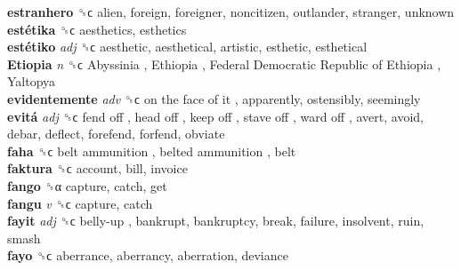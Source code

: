 \textbf{estranhero} ␝ϲ  alien, foreign, foreigner, noncitizen, outlander, stranger, unknown  \\
\textbf{estétika} ␝ϲ  aesthetics, esthetics  \\
\textbf{estétiko} \emph{adj}  ␝ϲ  aesthetic, aesthetical, artistic, esthetic, esthetical  \\
\textbf{Etiopia} \emph{n}  ␝ϲ   Abyssinia ,  Ethiopia ,  Federal Democratic Republic of Ethiopia ,  Yaltopya   \\
\textbf{evidentemente} \emph{adv}  ␝ϲ   on the face of it , apparently, ostensibly, seemingly  \\
\textbf{evitá} \emph{adj}  ␝ϲ   fend off ,  head off ,  keep off ,  stave off ,  ward off , avert, avoid, debar, deflect, forefend, forfend, obviate  \\
\textbf{faha} ␝ϲ   belt ammunition ,  belted ammunition , belt  \\
\textbf{faktura} ␝ϲ  account, bill, invoice  \\
\textbf{fango} ␝α  capture, catch, get  \\
\textbf{fangu} \emph{v}  ␝ϲ  capture, catch  \\
\textbf{fayit} \emph{adj}  ␝ϲ   belly-up , bankrupt, bankruptcy, break, failure, insolvent, ruin, smash  \\
\textbf{fayo} ␝ϲ  aberrance, aberrancy, aberration, deviance  \\
